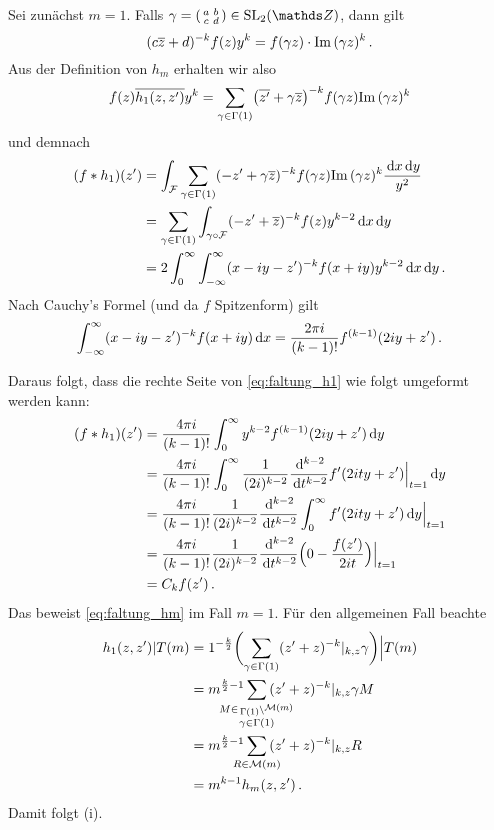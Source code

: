\begin{bewe}
	Sei zunächst $m=1$.
	Falls $\gamma = \abcd \in \SL_2(\ZZ)$, dann gilt
	\[
	(c\overline{z} + d)^{-k} f(z) y^k = f(\gamma z) \cdot \mathrm{Im}\, (\gamma z)^k
	\,.
	\]
	Aus der Definition von $h_m$ erhalten wir also
	\[
	f(z)\overline{h_1(z, z')} y^k
	= \sum_{\gamma \in \Gamma(1)} \bigl(\overline{z'} + \gamma \overline{z}\bigr)^{-k} f(\gamma z) \mathrm{Im}\,(\gamma z)^k
	\]
	und demnach
	\begin{equation}\label{eq:faltung_h1}%
	\begin{split}
	(f * h_1)(z') &= \int_\F \sum_{\gamma \in \Gamma(1)} (-z' + \gamma \conj z)^{-k} f(\gamma z) \Im(\gamma z)^k \frac{\opd x \opd y}{y^2} \\
	&= \sum_{\gamma \in \Gamma(1)} \int_{\gamma \circ \F} (-z' + \conj z)^{-k} f(z) y^{k-2} \opd x \opd y \\
	&= 2 \int_0^\infty \int_{-\infty}^\infty (x-iy - z')^{-k} f(x+iy) y^{k-2} \opd x \opd y
	\,.
	\end{split}
	\end{equation}
	Nach Cauchy's Formel (und da $f$ Spitzenform) gilt
	\[
	\int_{-\infty}^\infty (x-iy - z')^{-k} f(x+iy) \,\mathrm{d} x
	= \frac{2\pi i}{(k-1)!} f^{(k-1)} (2iy + z')
	\,.
	\]
	
	Daraus folgt, dass die rechte Seite von \eqref{eq:faltung_h1} wie folgt umgeformt werden kann:
	\begin{equation*}
	\begin{split}
	(f * h_1)(z') &= \frac{4\pi i}{(k-1)!} \int_0^\infty y^{k-2} f^{(k-1)} (2iy + z') \,\mathrm{d} y \\
	&= \frac{4\pi i}{(k-1)!} \int_0^\infty \frac{1}{(2i)^{k-2}} \frac{\,\mathrm{d}^{k-2}}{\,\mathrm{d} t^{k-2}} f'(2ity + z') \Big|_{t=1} \,\mathrm{d} y \\
	&= \frac{4\pi i}{(k-1)!} \frac{1}{(2i)^{k-2}} \frac{\,\mathrm{d}^{k-2}}{\,\mathrm{d} t^{k-2}} \int_0^\infty f'(2i ty + z') \,\mathrm{d} y \Big|_{t=1} \\
	&= \frac{4\pi i}{(k-1)!} \frac{1}{(2i)^{k-2}} \frac{\,\mathrm{d}^{k-2}}{\,\mathrm{d} t^{k-2}} \Bigl( 0 - \frac{f(z')}{2it}\Bigr) \Big|_{t=1} \\
	&= C_k f(z')
	\,.
	\end{split}
	\end{equation*}
	Das beweist \eqref{eq:faltung_hm} im Fall $m=1$.
	Für den allgemeinen Fall beachte
	\[
	\begin{split}
	h_1(z,z')|T(m)
	&= 1^{- \frac k2} \biggl(\sum_{\gamma\in\Gamma(1)} (z'+z)^{-k} |_{k,z} \gamma\biggr)\Big|T(m) \\
	&= m^{\frac k2 - 1} \smashoperator{\sum_{\substack{M \in \linksmodulo{\Gamma(1)}{\M(m)}\\ \gamma \in \Gamma(1)}}} \, (z'+z)^{-k} |_{k,z} \gamma M \\
	&= m^{\frac k2 - 1} \smashoperator{\sum_{R \in \M(m)}} \, (z'+z)^{-k}|_{k,z} R \\
	&= m^{k-1} h_m(z,z')
	\,.
	\end{split}
	\]
	Damit folgt (i).
	

\end{bewe}
